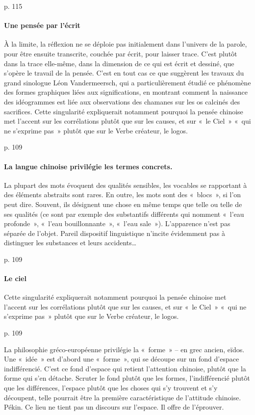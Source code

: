 \cite{PolDroit:voyage} p. 115 


\paragraph{Une pensée par l'écrit} À la limite, la réflexion ne se déploie pas initialement dans l’univers de la parole, pour être ensuite transcrite, couchée par écrit, pour laisser trace. C’est plutôt dans la trace elle-même, dans la dimension de ce qui est écrit et dessiné, que s’opère le travail de la pensée. C’est en tout cas ce que suggèrent les travaux du grand sinologue Léon Vandermeersch, qui a particulièrement étudié ce phénomène des formes graphiques liées aux significations, en montrant comment la naissance des idéogrammes est liée aux observations des chamanes sur les os calcinés des sacrifices. Cette singularité expliquerait notamment pourquoi la pensée chinoise met l’accent sur les corrélations plutôt que sur les causes, et sur « le Ciel » « qui ne s’exprime pas » plutôt que sur le Verbe créateur, le logos.

 

\cite{PolDroit:voyage} p. 109 

\paragraph{La langue chinoise privilégie les termes concrets. } La plupart des mots évoquent des qualités sensibles, les vocables se rapportant à des éléments abstraits sont rares. En outre, les mots sont des « blocs », si l’on peut dire. Souvent, ils désignent une chose en même temps que telle ou telle de ses qualités (ce sont par exemple des substantifs différents qui nomment « l’eau profonde », « l’eau bouillonnante », « l’eau sale »). L’apparence n’est pas séparée de l’objet. Pareil dispositif linguistique n’incite évidemment pas à distinguer les substances et leurs accidents…
 

\cite{PolDroit:voyage} p. 109 


\paragraph{Le ciel} Cette singularité expliquerait notamment pourquoi la pensée chinoise met l’accent sur les corrélations plutôt que sur les causes, et sur « le Ciel » « qui ne s’exprime pas » plutôt que sur le Verbe créateur, le logos.

\cite{PolDroit:voyage} p. 109 

La philosophie gréco-européenne privilégie la « forme » – en grec ancien, eïdos. Une « idée » est d’abord une « forme », qui se découpe sur un fond d’espace indifférencié. C’est ce fond d’espace qui retient l’attention chinoise, plutôt que la forme qui s’en détache. Scruter le fond plutôt que les formes, l’indifférencié plutôt que les différences, l’espace plutôt que les choses qui s’y trouvent et s’y découpent, telle pourrait être la première caractéristique de l’attitude chinoise.
Pékin. Ce lieu ne tient pas un discours sur l’espace. Il offre de l’éprouver.

